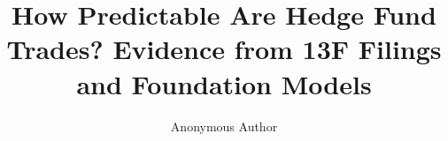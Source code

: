 \expandafter\documentclass\expandafter[\paperoptions]{acmart}
\begin{document}
\title{How Predictable Are Hedge Fund Trades? Evidence from 13F Filings and Foundation Models}

\author{Anonymous Author}


\maketitle











\end{document}
